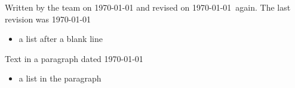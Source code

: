 \documentclass[12pt]{report}
\begin{document}
Written by the team on \today
and revised on \today\ again.
The last revision was \today

\begin{itemize}
\item a list after a blank line
\end{itemize}
Text in a paragraph dated \today
\begin{itemize}
\item a list in the paragraph
\end{itemize}
\end{document}
